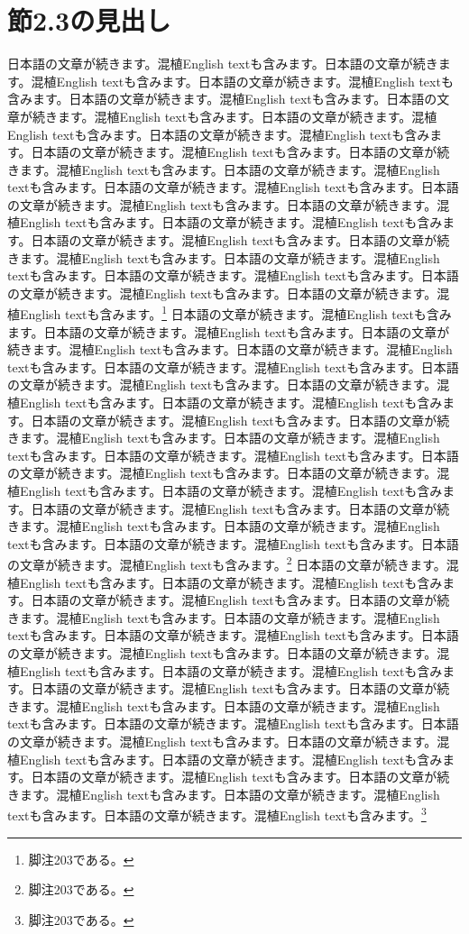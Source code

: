 \documentclass[pdflatex,book]{jlreq}
\begin{document}
\section{節2.3の見出し}
日本語の文章が続きます。混植English textも含みます。日本語の文章が続きます。混植English textも含みます。日本語の文章が続きます。混植English textも含みます。日本語の文章が続きます。混植English textも含みます。日本語の文章が続きます。混植English textも含みます。日本語の文章が続きます。混植English textも含みます。日本語の文章が続きます。混植English textも含みます。日本語の文章が続きます。混植English textも含みます。日本語の文章が続きます。混植English textも含みます。日本語の文章が続きます。混植English textも含みます。日本語の文章が続きます。混植English textも含みます。日本語の文章が続きます。混植English textも含みます。日本語の文章が続きます。混植English textも含みます。日本語の文章が続きます。混植English textも含みます。日本語の文章が続きます。混植English textも含みます。日本語の文章が続きます。混植English textも含みます。日本語の文章が続きます。混植English textも含みます。日本語の文章が続きます。混植English textも含みます。日本語の文章が続きます。混植English textも含みます。日本語の文章が続きます。混植English textも含みます。\footnote{脚注203である。}
日本語の文章が続きます。混植English textも含みます。日本語の文章が続きます。混植English textも含みます。日本語の文章が続きます。混植English textも含みます。日本語の文章が続きます。混植English textも含みます。日本語の文章が続きます。混植English textも含みます。日本語の文章が続きます。混植English textも含みます。日本語の文章が続きます。混植English textも含みます。日本語の文章が続きます。混植English textも含みます。日本語の文章が続きます。混植English textも含みます。日本語の文章が続きます。混植English textも含みます。日本語の文章が続きます。混植English textも含みます。日本語の文章が続きます。混植English textも含みます。日本語の文章が続きます。混植English textも含みます。日本語の文章が続きます。混植English textも含みます。日本語の文章が続きます。混植English textも含みます。日本語の文章が続きます。混植English textも含みます。日本語の文章が続きます。混植English textも含みます。日本語の文章が続きます。混植English textも含みます。日本語の文章が続きます。混植English textも含みます。日本語の文章が続きます。混植English textも含みます。\footnote{脚注203である。}
日本語の文章が続きます。混植English textも含みます。日本語の文章が続きます。混植English textも含みます。日本語の文章が続きます。混植English textも含みます。日本語の文章が続きます。混植English textも含みます。日本語の文章が続きます。混植English textも含みます。日本語の文章が続きます。混植English textも含みます。日本語の文章が続きます。混植English textも含みます。日本語の文章が続きます。混植English textも含みます。日本語の文章が続きます。混植English textも含みます。日本語の文章が続きます。混植English textも含みます。日本語の文章が続きます。混植English textも含みます。日本語の文章が続きます。混植English textも含みます。日本語の文章が続きます。混植English textも含みます。日本語の文章が続きます。混植English textも含みます。日本語の文章が続きます。混植English textも含みます。日本語の文章が続きます。混植English textも含みます。日本語の文章が続きます。混植English textも含みます。日本語の文章が続きます。混植English textも含みます。日本語の文章が続きます。混植English textも含みます。日本語の文章が続きます。混植English textも含みます。\footnote{脚注203である。}
\end{document}

